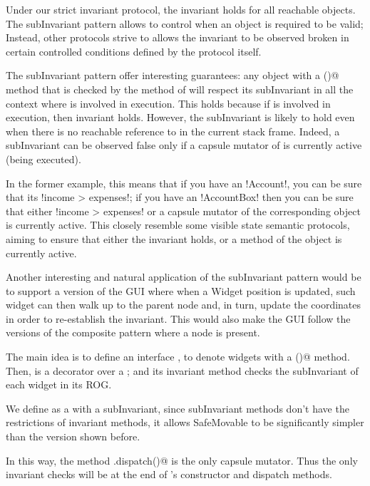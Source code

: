 Under our strict invariant protocol, the invariant holds for all reachable objects.
The subInvariant pattern allows to control when an object is required to be valid;
Instead, other protocols strive to allows the invariant to be observed broken in certain controlled conditions defined by the protocol itself.

The subInvariant pattern offer interesting guarantees:
any object \Q@a@ with a \Q@subInvariant()@ method that is checked by the \Q@invariant@ method of \Q@b@
will respect its subInvariant in all the context where \Q@b@ is involved in execution.
This holds because if \Q@b@ is involved in execution, then \Q@b@ invariant holds.
However, the subInvariant is likely to hold even when there is no reachable reference to \Q@b@ in the current stack frame.
Indeed, a subInvariant can be observed false only if a capsule mutator of \Q@b@ is currently active (being executed).

In the former example, this means that
if you have an \Q!Account!, you can be sure that its \Q!income > expenses!;
if you have an \Q!AccountBox! then you can be sure that either \Q!income > expenses! or 
a capsule mutator of the corresponding \Q@Account@ object is currently active.
This closely resemble some visible state semantic protocols, aiming to ensure that  
either the invariant holds, or a method of the object is currently active.


Another interesting and natural application of the subInvariant pattern would be to support a version of the GUI where when a Widget position is updated, such widget can then walk up to the parent node and, in turn, update the coordinates in order to re-establish the invariant.
This would also make the GUI follow the versions of the composite pattern where a \Q@parent@ node is present.

The main idea is to define an interface \Q@HasSubInvariant@, to denote widgets with a \Q@subInvariant()@ method. Then, \Q@WidgetWithInvariant@ is a decorator over a \Q@Widget@; and its invariant method checks the subInvariant of each widget in its ROG.

We define \Q@SafeMovable@ as a \Q@Widget@ with a subInvariant, since subInvariant methods don't have the restrictions of invariant methods, it allows SafeMovable to be significantly simpler than the version shown before.

In this way, the method \Q@WidgetWithInvariant.dispatch()@ is the only capsule mutator. Thus the only invariant checks will be at the end of \Q@WidgetWithInvariant@'s constructor and dispatch methods.

